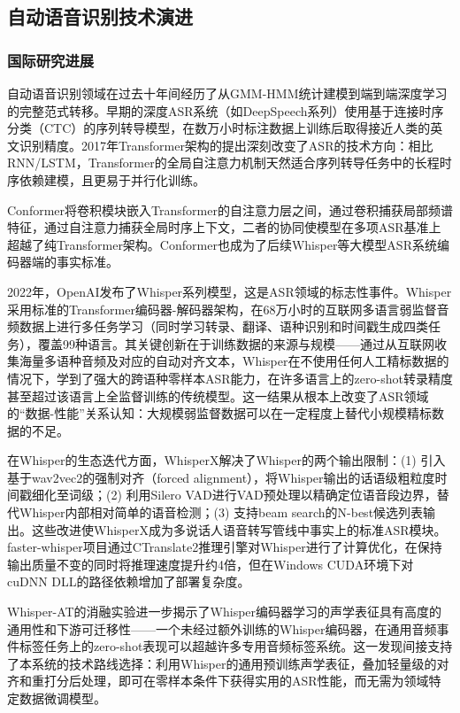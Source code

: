 \documentclass[12pt, a4paper]{article}
\begin{document}
\subsection{自动语音识别技术演进}

\subsubsection{国际研究进展}

自动语音识别领域在过去十年间经历了从GMM-HMM统计建模到端到端深度学习的完整范式转移。早期的深度ASR系统（如DeepSpeech系列）使用基于连接时序分类（CTC）的序列转导模型，在数万小时标注数据上训练后取得接近人类的英文识别精度。2017年Transformer架构\cite{vaswani2017transformer}的提出深刻改变了ASR的技术方向：相比RNN/LSTM，Transformer的全局自注意力机制天然适合序列转导任务中的长程时序依赖建模，且更易于并行化训练。

Conformer\cite{gulati2020conformer}将卷积模块嵌入Transformer的自注意力层之间，通过卷积捕获局部频谱特征，通过自注意力捕获全局时序上下文，二者的协同使模型在多项ASR基准上超越了纯Transformer架构。Conformer也成为了后续Whisper等大模型ASR系统编码器端的事实标准。

2022年，OpenAI发布了Whisper系列模型\cite{radford2022whisper}，这是ASR领域的标志性事件。Whisper采用标准的Transformer编码器-解码器架构，在68万小时的互联网多语言弱监督音频数据上进行多任务学习（同时学习转录、翻译、语种识别和时间戳生成四类任务），覆盖99种语言。其关键创新在于训练数据的来源与规模——通过从互联网收集海量多语种音频及对应的自动对齐文本，Whisper在不使用任何人工精标数据的情况下，学到了强大的跨语种零样本ASR能力，在许多语言上的zero-shot转录精度甚至超过该语言上全监督训练的传统模型。这一结果从根本上改变了ASR领域的``数据-性能''关系认知：大规模弱监督数据可以在一定程度上替代小规模精标数据的不足。

在Whisper的生态迭代方面，WhisperX\cite{bain2023whisperx}解决了Whisper的两个输出限制：(1) 引入基于wav2vec2\cite{babu2021xlsr}的强制对齐（forced alignment），将Whisper输出的话语级粗粒度时间戳细化至词级；(2) 利用Silero VAD进行VAD预处理以精确定位语音段边界，替代Whisper内部相对简单的语音检测；(3) 支持beam search的N-best候选列表输出。这些改进使WhisperX成为多说话人语音转写管线中事实上的标准ASR模块。faster-whisper项目通过CTranslate2推理引擎对Whisper进行了计算优化，在保持输出质量不变的同时将推理速度提升约4倍，但在Windows CUDA环境下对cuDNN DLL的路径依赖增加了部署复杂度。

Whisper-AT\cite{gong2023whisperat}的消融实验进一步揭示了Whisper编码器学习的声学表征具有高度的通用性和下游可迁移性——一个未经过额外训练的Whisper编码器，在通用音频事件标签任务上的zero-shot表现可以超越许多专用音频标签系统。这一发现间接支持了本系统的技术路线选择：利用Whisper的通用预训练声学表征，叠加轻量级的对齐和重打分后处理，即可在零样本条件下获得实用的ASR性能，而无需为领域特定数据微调模型。
\end{document}
